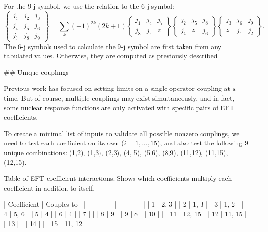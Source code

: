 For the 9-j symbol, we use the relation to the 6-j symbol:
\begin{equation}
    \begin{Bmatrix}
        j_1 & j_2 & j_3\\
        j_4 & j_5 & j_6\\
        j_7 & j_8 & j_9
    \end{Bmatrix}
    = \sum_k (-1)^{2k} (2k+1)
      \begin{Bmatrix}
        j_1 & j_4 & j_7\\
        j_8 & j_9 & z
      \end{Bmatrix}
      \begin{Bmatrix}
        j_2 & j_5 & j_8\\
        j_4 & z & j_6
      \end{Bmatrix}
      \begin{Bmatrix}
        j_3 & j_6 & j_9\\
        z & j_1 & j_2
      \end{Bmatrix}.        
\end{equation}
The 6-j symbols used to calculate the 9-j symbol are first taken from any
tabulated values. Otherwise, they are computed as previously described.

## Unique couplings

Previous work has focused on setting limits on a single operator coupling at a
time. But of course, multiple couplings may exist simultaneously, and in fact,
some nuclear response functions are only activated with specific pairs of EFT
coefficients.

To create a minimal list of inputs to validate all possible nonzero
couplings, we need to test each coefficient on its own ($i=1,...,15$), and also
test the following 9 unique combinations: (1,2), (1,3), (2,3), (4, 5), (5,6),
(8,9), (11,12), (11,15), (12,15).

Table of EFT coefficient interactions. Shows which coefficients
    multiply each coefficient in addition to itself.

| Coefficient | Couples to |
| ----------- | ---------- |
| 1           |   2, 3   |
| 2           |   1, 3   |
| 3           |   1, 2   |
| 4           |   5, 6   |
| 5           |   4      |
| 6           |   4      |
| 7           |          |
| 8           |   9      |
| 9           |   8      |
| 10          |          |
| 11          |   12, 15 |
| 12          |   11, 15 |
| 13          |          |
| 14          |          |
| 15          |   11, 12 |
